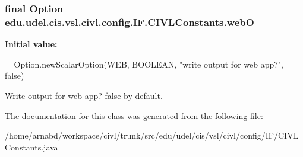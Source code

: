 \subsubsection[{web\+O}]{\setlength{\rightskip}{0pt plus 5cm}final Option edu.\+udel.\+cis.\+vsl.\+civl.\+config.\+I\+F.\+C\+I\+V\+L\+Constants.\+web\+O\hspace{0.3cm}{\ttfamily [static]}}\label{classedu_1_1udel_1_1cis_1_1vsl_1_1civl_1_1config_1_1IF_1_1CIVLConstants_a04157ad0ddb32229565aa679373a5039}
{\bfseries Initial value\+:}
\begin{DoxyCode}
= Option.newScalarOption(WEB, BOOLEAN,
            \textcolor{stringliteral}{"write output for web app?"}, \textcolor{keyword}{false})
\end{DoxyCode}


Write output for web app? false by default. 



The documentation for this class was generated from the following file\+:\begin{DoxyCompactItemize}
\item 
/home/arnabd/workspace/civl/trunk/src/edu/udel/cis/vsl/civl/config/\+I\+F/C\+I\+V\+L\+Constants.\+java\end{DoxyCompactItemize}
